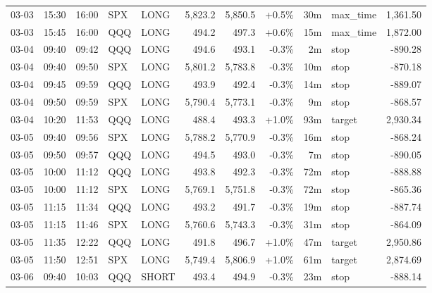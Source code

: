 \documentclass[11pt,a4paper,twoside]{article}
\begin{document}
\begin{center}
\begin{longtable}{>{\color{txtmain}}l l l l l r r r r >{\color{txtmain}}l r}
03-03 & 15:30 & 16:00 & SPX & LONG & 5,823.2 & 5,850.5 & \textcolor{wingreen}{+0.5\%} & 30m & max\_time & \textcolor{wingreen}{1,361.50} \\
03-03 & 15:45 & 16:00 & QQQ & LONG & 494.2 & 497.3 & \textcolor{wingreen}{+0.6\%} & 15m & max\_time & \textcolor{wingreen}{1,872.00} \\
03-04 & 09:40 & 09:42 & QQQ & LONG & 494.6 & 493.1 & \textcolor{lossred}{-0.3\%} & 2m & stop & \textcolor{lossred}{-890.28} \\
03-04 & 09:40 & 09:50 & SPX & LONG & 5,801.2 & 5,783.8 & \textcolor{lossred}{-0.3\%} & 10m & stop & \textcolor{lossred}{-870.18} \\
03-04 & 09:45 & 09:59 & QQQ & LONG & 493.9 & 492.4 & \textcolor{lossred}{-0.3\%} & 14m & stop & \textcolor{lossred}{-889.07} \\
03-04 & 09:50 & 09:59 & SPX & LONG & 5,790.4 & 5,773.1 & \textcolor{lossred}{-0.3\%} & 9m & stop & \textcolor{lossred}{-868.57} \\
03-04 & 10:20 & 11:53 & QQQ & LONG & 488.4 & 493.3 & \textcolor{wingreen}{+1.0\%} & 93m & target & \textcolor{wingreen}{2,930.34} \\
03-05 & 09:40 & 09:56 & SPX & LONG & 5,788.2 & 5,770.9 & \textcolor{lossred}{-0.3\%} & 16m & stop & \textcolor{lossred}{-868.24} \\
03-05 & 09:50 & 09:57 & QQQ & LONG & 494.5 & 493.0 & \textcolor{lossred}{-0.3\%} & 7m & stop & \textcolor{lossred}{-890.05} \\
03-05 & 10:00 & 11:12 & QQQ & LONG & 493.8 & 492.3 & \textcolor{lossred}{-0.3\%} & 72m & stop & \textcolor{lossred}{-888.88} \\
03-05 & 10:00 & 11:12 & SPX & LONG & 5,769.1 & 5,751.8 & \textcolor{lossred}{-0.3\%} & 72m & stop & \textcolor{lossred}{-865.36} \\
03-05 & 11:15 & 11:34 & QQQ & LONG & 493.2 & 491.7 & \textcolor{lossred}{-0.3\%} & 19m & stop & \textcolor{lossred}{-887.74} \\
03-05 & 11:15 & 11:46 & SPX & LONG & 5,760.6 & 5,743.3 & \textcolor{lossred}{-0.3\%} & 31m & stop & \textcolor{lossred}{-864.09} \\
03-05 & 11:35 & 12:22 & QQQ & LONG & 491.8 & 496.7 & \textcolor{wingreen}{+1.0\%} & 47m & target & \textcolor{wingreen}{2,950.86} \\
03-05 & 11:50 & 12:51 & SPX & LONG & 5,749.4 & 5,806.9 & \textcolor{wingreen}{+1.0\%} & 61m & target & \textcolor{wingreen}{2,874.69} \\
03-06 & 09:40 & 10:03 & QQQ & SHORT & 493.4 & 494.9 & \textcolor{lossred}{-0.3\%} & 23m & stop & \textcolor{lossred}{-888.14} \\

\end{longtable}
\end{center}
\end{document}
